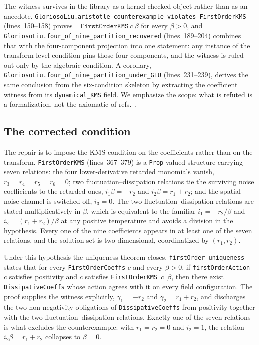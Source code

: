 \documentclass[11pt]{article}
\begin{document}
The witness survives in the library as a kernel-checked object rather
than as an anecdote. \texttt{GloriosoLiu.aristotle\_counterexample\_violates\_FirstOrderKMS}
(lines~150--158) proves
$\neg\,\texttt{FirstOrderKMS}\ c\ \beta$ for every $\beta > 0$, and
\texttt{GloriosoLiu.four\_of\_nine\_partition\_recovered}
(lines~189--204) combines that with the four-component projection into
one statement: any instance of the transform-level condition pins those
four components, and the witness is ruled out only by the algebraic
condition. A corollary,
\texttt{GloriosoLiu.four\_of\_nine\_partition\_under\_GLU}
(lines~231--239), derives the same conclusion from the six-condition
skeleton by extracting the coefficient witness from its
\texttt{dynamical\_KMS} field. We emphasize the scope: what is refuted
is a formalization, not the axiomatic of
refs.~\cite{CrossleyGloriosoLiu2017,GloriosoCrossleyLiu2017}.

\subsection{The corrected condition}

The repair is to impose the KMS condition on the coefficients rather
than on the transform. \texttt{FirstOrderKMS} (lines~367--379) is a
\texttt{Prop}-valued structure carrying seven relations: the four
lower-derivative retarded monomials vanish,
$r_3 = r_4 = r_5 = r_6 = 0$; two fluctuation--dissipation relations tie
the surviving noise coefficients to the retarded ones,
$i_1\beta = -r_2$ and $i_2\beta = r_1 + r_2$; and the spatial noise
channel is switched off, $i_3 = 0$. The two fluctuation--dissipation
relations are stated multiplicatively in $\beta$, which is equivalent to
the familiar $i_1 = -r_2/\beta$ and $i_2 = (r_1+r_2)/\beta$ at any
positive temperature and avoids a division in the hypothesis. Every one
of the nine coefficients appears in at least one of the seven relations,
and the solution set is two-dimensional, coordinatized by $(r_1,r_2)$.

Under this hypothesis the uniqueness theorem closes.
\texttt{firstOrder\_uniqueness} states that for every
\texttt{FirstOrderCoeffs} $c$ and every $\beta > 0$, if
\texttt{firstOrderAction}~$c$ satisfies positivity and $c$ satisfies
\texttt{FirstOrderKMS}~$c$~$\beta$, then there exist
\texttt{DissipativeCoeffs} whose action agrees with it on every field
configuration. The proof supplies the witness explicitly,
$\gamma_1 = -r_2$ and $\gamma_2 = r_1 + r_2$, and discharges the two
non-negativity obligations of \texttt{DissipativeCoeffs} from positivity
together with the two fluctuation--dissipation relations. Exactly one of
the seven relations is what excludes the counterexample: with
$r_1 = r_2 = 0$ and $i_2 = 1$, the relation $i_2\beta = r_1 + r_2$
collapses to $\beta = 0$.
\end{document}
